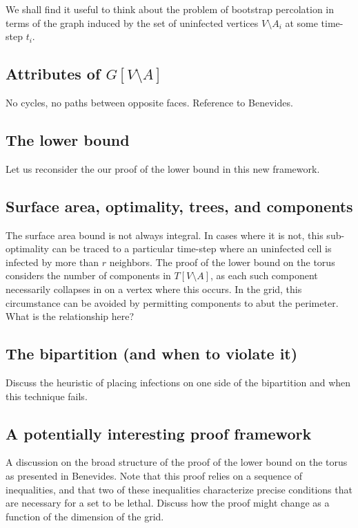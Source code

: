 We shall find it useful to think about the problem of bootstrap percolation in terms of the graph induced by the set of uninfected vertices $V \setminus A_i$ at some time-step $t_i$. 

\subsection{Attributes of $G[V \setminus A]$}

No cycles, no paths between opposite faces. Reference to Benevides.

\subsection{The lower bound}

Let us reconsider the our proof of the lower bound in this new framework. 

\subsection{Surface area, optimality, trees, and components}

The surface area bound is not always integral. In cases where it is not, this sub-optimality can be traced to a particular time-step where an uninfected cell is infected by more than $r$ neighbors. The proof of the lower bound on the torus considers the number of components in $T[V \setminus A]$, as each such component necessarily collapses in on a vertex where this occurs. In the grid, this circumstance can be avoided by permitting components to abut the perimeter. What is the relationship here?

\subsection{The bipartition (and when to violate it)}

Discuss the heuristic of placing infections on one side of the bipartition and when this technique fails. 

\subsection{A potentially interesting proof framework}

A discussion on the broad structure of the proof of the lower bound on the torus as presented in Benevides. Note that this proof relies on a sequence of inequalities, and that two of these inequalities characterize precise conditions that are necessary for a set to be lethal. Discuss how the proof might change as a function of the dimension of the grid. 

